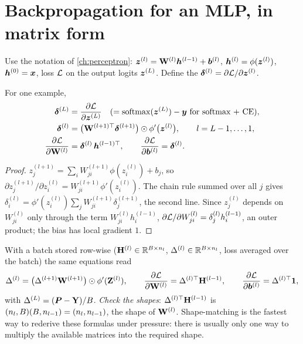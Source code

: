 \section{Backpropagation for an MLP, in matrix form}

Use the notation of \cref{ch:perceptron}: ${\bm{z}}^{(l)}={\mathbf{W}}^{(l)}{\bm{h}}^{(l-1)}+{\bm{b}}^{(l)}$,
${\bm{h}}^{(l)}=\phi({\bm{z}}^{(l)})$, ${\bm{h}}^{(0)}={\bm{x}}$, loss $\mathcal{L}$ on the output logits
${\bm{z}}^{(L)}$. Define the  $\bm{\delta}^{(l)}=\partial\mathcal{L}/\partial{\bm{z}}^{(l)}$.

\begin{theorem}
	For one example,
	\begin{align*}
		\bm{\delta}^{(L)} &= \frac{\partial \mathcal{L}}{\partial {\bm{z}}^{(L)}} \quad(\text{$=\operatorname{softmax}({\bm{z}}^{(L)})-{\bm{y}}$ for softmax + CE}),\\
		\bm{\delta}^{(l)} &= \bigl({\mathbf{W}}^{(l+1)\top}\bm{\delta}^{(l+1)}\bigr)\odot\phi'\bigl({\bm{z}}^{(l)}\bigr), \qquad l=L-1,\dots,1,\\
		\frac{\partial \mathcal{L}}{\partial {\mathbf{W}}^{(l)}} &= \bm{\delta}^{(l)}\,{\bm{h}}^{(l-1)\top}, \qquad
		\frac{\partial \mathcal{L}}{\partial {\bm{b}}^{(l)}} = \bm{\delta}^{(l)}.
	\end{align*}
\end{theorem}
\begin{proof}
	$z^{(l+1)}_j=\sum_i W^{(l+1)}_{ji}\phi(z^{(l)}_i)+b_j$, so
	$\partial z^{(l+1)}_j/\partial z^{(l)}_i = W^{(l+1)}_{ji}\phi'(z^{(l)}_i)$. The chain rule
	summed over all $j$ gives
	$\delta^{(l)}_i=\phi'(z^{(l)}_i)\sum_j W^{(l+1)}_{ji}\delta^{(l+1)}_j$, the second line.
	Since $z^{(l)}_j$ depends on $W^{(l)}_{ji}$ only through the term $W^{(l)}_{ji}h^{(l-1)}_i$,
	$\partial\mathcal{L}/\partial W^{(l)}_{ji}=\delta^{(l)}_jh^{(l-1)}_i$, an outer product; the
	bias has local gradient $1$.
\end{proof}

With a batch stored row-wise (${\mathbf{H}}^{(l)}\in\mathbb R^{B\times n_l}$, $\Delta^{(l)}\in\mathbb R^{B\times n_l}$,
loss averaged over the batch) the same equations read
\[
	\Delta^{(l)} = \bigl(\Delta^{(l+1)}{\mathbf{W}}^{(l+1)}\bigr)\odot\phi'(\mathbf Z^{(l)}),\qquad
	\frac{\partial \mathcal{L}}{\partial {\mathbf{W}}^{(l)}} = \Delta^{(l)\top}{\mathbf{H}}^{(l-1)},\qquad
	\frac{\partial \mathcal{L}}{\partial {\bm{b}}^{(l)}} = \Delta^{(l)\top}{\bm{1}},
\]
with $\Delta^{(L)}=(\bm P-{\mathbf{Y}})/B$. \emph{Check the shapes}: $\Delta^{(l)\top}{\mathbf{H}}^{(l-1)}$ is
$(n_l,B)(B,n_{l-1})=(n_l,n_{l-1})$, the shape of ${\mathbf{W}}^{(l)}$. Shape-matching is
the fastest way to rederive these formulas under pressure: there is usually only one
way to multiply the available matrices into the required shape.

